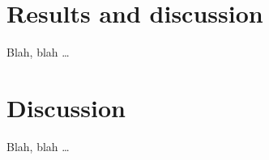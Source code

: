 \chapter{Results and discussion}\label{sec:something}

Blah, blah \dots

 \cleardoublepage


\chapter{Discussion}\label{sec:again_something}

Blah, blah \dots

 \cleardoublepage
